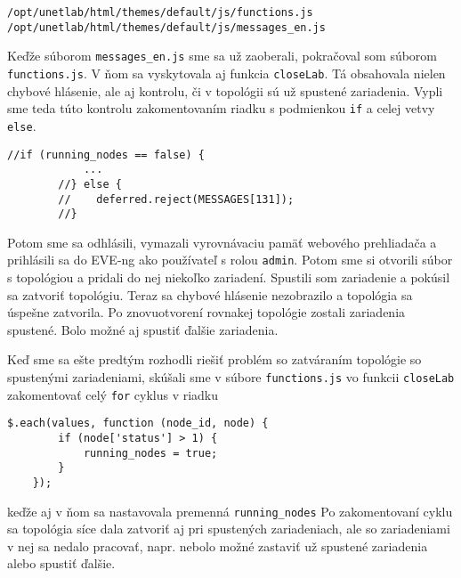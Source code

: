 \renewcommand\baselinestretch{1}
\begin{Verbatim}[samepage=true]
/opt/unetlab/html/themes/default/js/functions.js
/opt/unetlab/html/themes/default/js/messages_en.js
\end{Verbatim}
\renewcommand\baselinestretch{1.5}

Keďže súborom \texttt{messages\_en.js} sme sa už zaoberali, pokračoval som súborom \texttt{functions.js}. V ňom sa vyskytovala aj funkcia \texttt{closeLab}. Tá obsahovala nielen chybové hlásenie, ale aj kontrolu, či v topológii sú už spustené zariadenia. Vypli sme teda túto kontrolu zakomentovaním riadku s podmienkou \texttt{if} a celej vetvy \texttt{else}.

\renewcommand\baselinestretch{1}
\begin{Verbatim}[samepage=true]
        //if (running_nodes == false) {
            ...
        //} else {
        //    deferred.reject(MESSAGES[131]);
        //}
\end{Verbatim}
\renewcommand\baselinestretch{1.5}

Potom sme sa odhlásili, vymazali vyrovnávaciu pamäť webového prehliadača a prihlásili sa do EVE-ng ako používateľ s rolou \texttt{admin}. Potom sme si otvorili súbor s topológiou a pridali do nej niekoľko zariadení. Spustili som zariadenie a pokúsil sa zatvoriť topológiu. Teraz sa chybové hlásenie nezobrazilo a topológia sa úspešne zatvorila. Po znovuotvorení rovnakej topológie zostali zariadenia spustené. Bolo možné aj spustiť ďalšie zariadenia.

Keď sme sa ešte predtým rozhodli riešiť problém so zatváraním topológie so spustenými zariadeniami, skúšali sme v súbore \texttt{functions.js} vo funkcii \texttt{closeLab} zakomentovať celý \texttt{for} cyklus v riadku

\renewcommand\baselinestretch{1}
\begin{Verbatim}[samepage=true]
    $.each(values, function (node_id, node) {
        if (node['status'] > 1) {
            running_nodes = true;
        }
    });
\end{Verbatim}
\renewcommand\baselinestretch{1.5}
keďže aj v ňom sa nastavovala premenná \texttt{running\_nodes} Po zakomentovaní cyklu sa topológia síce dala zatvoriť aj pri spustených zariadeniach, ale so zariadeniami v nej sa nedalo pracovať, napr. nebolo možné zastaviť už spustené zariadenia alebo spustiť ďalšie.

